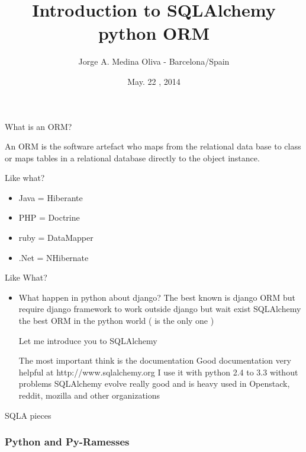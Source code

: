 \documentclass[seagull]{beamer}
\author{Jorge A. Medina Oliva - Barcelona/Spain}
\title{Introduction to SQLAlchemy python ORM}
\date{May. 22 , 2014}
\begin{document}
\begin{frame}
\titlepage
\end{frame}


\begin{frame}{What is an ORM?}

An ORM is the software artefact who maps from the relational data base to class 
or maps tables in a relational database directly to the object instance.

\end{frame}

\begin{frame}{Like what?}
\begin{itemize}
	\item Java = Hiberante
	\item PHP = Doctrine
	\item ruby = DataMapper
	\item .Net = NHibernate
\end{itemize}
\end{frame}

\begin{frame}{Like What?}
\begin{itemize}
	\item What happen in python about django?
The best known is django ORM but require django framework to work outside django
but wait exist SQLAlchemy the best ORM in the python world ( is the only one )

Let me introduce you to SQLAlchemy

The most important think is the documentation
Good documentation very helpful at http://www.sqlalchemy.org
I use it with python 2.4 to  3.3 without problems
SQLAlchemy evolve really good and is heavy used in Openstack, reddit, mozilla and other organizations
\end{itemize}
\end{frame}

\begin{frame}{SQLA pieces}
\centering{}
\end{frame}

\begin{frame}
    \frametitle{Python and Py-Ramesses}
    \inputminted{python}{filename.py}
\end{frame}
\end{document}
